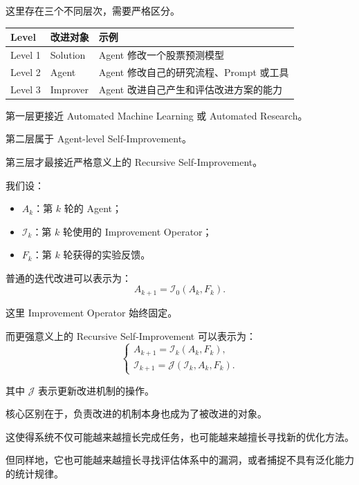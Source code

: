 这里存在三个不同层次，需要严格区分。

\begin{readertable}
\begin{longtable}[]{@{}
  >{\raggedright\arraybackslash}p{}
  >{\raggedright\arraybackslash}p{}
  >{\raggedright\arraybackslash}p{}@{}}
\toprule
Level & 改进对象 & 示例 \\
\midrule
\endhead
Level 1 & Solution & Agent 修改一个股票预测模型 \\
Level 2 & Agent & Agent 修改自己的研究流程、Prompt 或工具 \\
Level 3 & Improver & Agent 改进自己产生和评估改进方案的能力 \\
\bottomrule
\end{longtable}
\end{readertable}

第一层更接近 Automated Machine Learning 或 Automated Research。

第二层属于 Agent-level Self-Improvement。

第三层才最接近严格意义上的 Recursive Self-Improvement。

我们设：

\begin{itemize}
\tightlist
\item
  \(A_k\)：第 \(k\) 轮的 Agent；
\item
  \(\mathcal I_k\)：第 \(k\) 轮使用的 Improvement Operator；
\item
  \(F_k\)：第 \(k\) 轮获得的实验反馈。
\end{itemize}

普通的迭代改进可以表示为：
\[A_{k+1}=\mathcal I_0(A_k,F_k).\]

这里 Improvement Operator 始终固定。

而更强意义上的 Recursive Self-Improvement 可以表示为：
\[\begin{cases}
A_{k+1}=\mathcal I_k(A_k,F_k),\\[4pt]
\mathcal I_{k+1}=\mathcal J(\mathcal I_k,A_k,F_k).
\end{cases}\]

其中 \(\mathcal J\) 表示更新改进机制的操作。

核心区别在于，负责改进的机制本身也成为了被改进的对象。

这使得系统不仅可能越来越擅长完成任务，也可能越来越擅长寻找新的优化方法。

但同样地，它也可能越来越擅长寻找评估体系中的漏洞，或者捕捉不具有泛化能力的统计规律。

